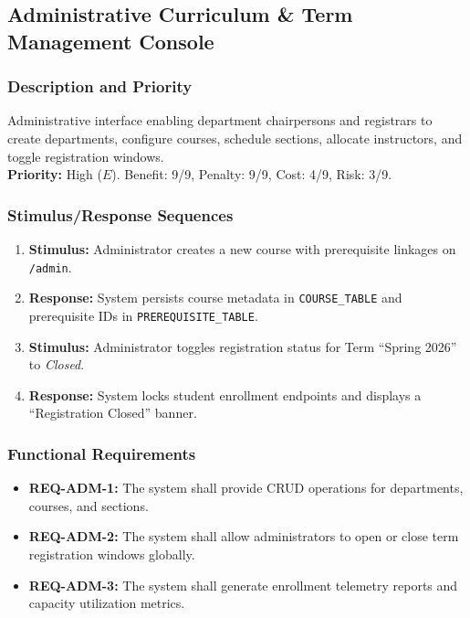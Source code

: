 \documentclass[a4paper,12pt]{article}
\begin{document}
\subsection{Administrative Curriculum \& Term Management Console}

\subsubsection{Description and Priority}
Administrative interface enabling department chairpersons and registrars to create departments, configure courses, schedule sections, allocate instructors, and toggle registration windows. \\
\textbf{Priority:} High ($E$). Benefit: 9/9, Penalty: 9/9, Cost: 4/9, Risk: 3/9.

\subsubsection{Stimulus/Response Sequences}
\begin{enumerate}[leftmargin=1.2cm]
    \item \textbf{Stimulus:} Administrator creates a new course with prerequisite linkages on \texttt{/admin}.
    \item \textbf{Response:} System persists course metadata in \texttt{COURSE\_TABLE} and prerequisite IDs in \texttt{PREREQUISITE\_TABLE}.
    \item \textbf{Stimulus:} Administrator toggles registration status for Term ``Spring 2026'' to \textit{Closed}.
    \item \textbf{Response:} System locks student enrollment endpoints and displays a ``Registration Closed'' banner.
\end{enumerate}

\subsubsection{Functional Requirements}
\begin{itemize}[leftmargin=1.2cm]
    \item \textbf{REQ-ADM-1:} The system shall provide CRUD operations for departments, courses, and sections.
    \item \textbf{REQ-ADM-2:} The system shall allow administrators to open or close term registration windows globally.
    \item \textbf{REQ-ADM-3:} The system shall generate enrollment telemetry reports and capacity utilization metrics.
\end{itemize}
\end{document}
